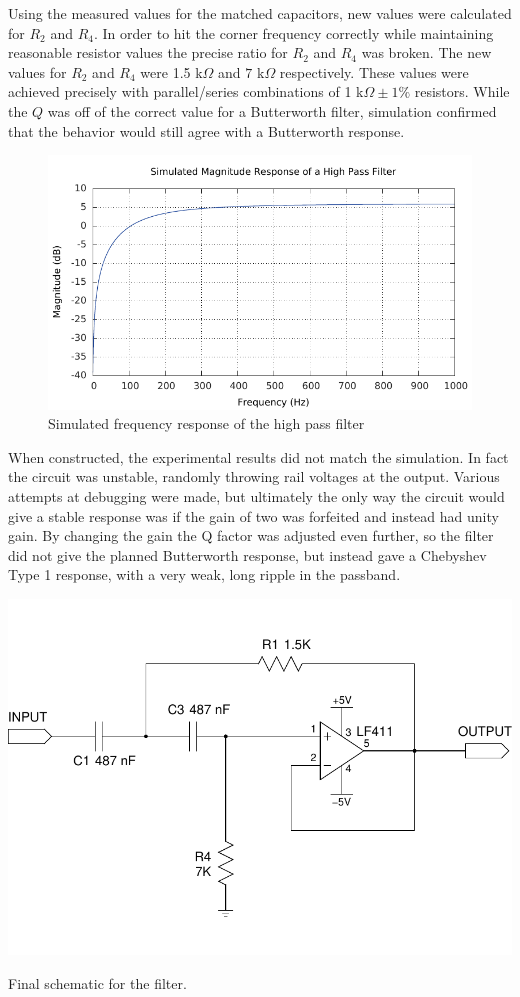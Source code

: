 \documentclass[justified]{tufte-handout}
\begin{document}
Using the measured values for the matched capacitors, new values were calculated
for $R_2$ and $R_4$. In order to hit the corner frequency correctly while
maintaining reasonable resistor values the precise ratio for $R_2$ and $R_4$ was
broken. The new values for $R_2$ and $R_4$ were 1.5 k$\Omega$ and $7$ k$\Omega$
respectively. These values were achieved precisely with parallel/series
combinations of 1 k$\Omega \pm 1\%$ resistors. While the $Q$ was off of the
correct value for a Butterworth filter, simulation confirmed that the behavior
would still agree with a Butterworth response.
\begin{figure}
\centering
\label{simRes}
\includegraphics[width=0.9\linewidth]{simResponse.pdf}
\caption{Simulated frequency response of the high pass filter}
\end{figure}
When constructed, the experimental results did not match the simulation. In fact
the circuit was unstable, randomly throwing rail voltages at the output. Various
attempts at debugging were made, but ultimately the only way the circuit would
give a stable response was if the gain of two was forfeited and instead had
unity gain. By changing the gain the Q factor was adjusted even further, so the
filter did not give the planned Butterworth response, but instead gave a
Chebyshev Type 1 response, with a very weak, long ripple in the passband.
\begin{marginfigure}
\centering
\label{schemExp}
\includegraphics[width=1.1\linewidth,trim=0 .3in 0 .35in,clip=true]{schemExp.pdf}
\caption{Final schematic for the filter.}
\end{marginfigure}
\clearpage
\end{document}
